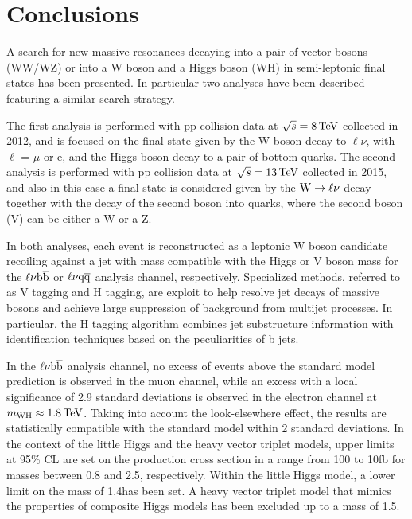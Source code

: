 \chapter{Conclusions}
\label{ch:summary1}

A search for new massive resonances decaying into a pair of vector bosons (WW/WZ) or into a W boson and a Higgs boson (WH)
in semi-leptonic final states has been presented. In particular two analyses have been described featuring a similar search strategy.

The first analysis is performed with pp collision data at $\sqrt{s} = 8\,\text{Te\hspace{-.08em}V}$ collected in 2012, and is focused on the final state given by the W boson decay to $\ell\nu$, with $\ell$ = $\mu$ or e,
and the Higgs boson decay to a pair of bottom quarks.
The second analysis is performed with pp collision data at $\sqrt{s} = 13\,\text{Te\hspace{-.08em}V}$ collected in 2015, and also in this case a final state is considered given by the $\mathrm{W}\to\ell\nu$ decay together with the decay of the second boson into quarks, where the second boson (V) can be either a W or a Z. 

In both analyses, each event is reconstructed as a leptonic W boson candidate recoiling against a jet with mass compatible with the Higgs or V boson mass for the $\ell\nu{\mathrm{b}\overline{\mathrm{b}}}$ or $\ell\nu\mathrm{q}\overline{\mathrm{q}}$ analysis channel, respectively.
Specialized methods, referred to as V tagging and H tagging, are exploit to help resolve jet decays of massive bosons and achieve large suppression of background from multijet processes.
In particular, the H tagging algorithm combines jet substructure information with identification techniques based on the peculiarities of b jets.

In the $\ell\nu{\mathrm{b}\overline{\mathrm{b}}}$ analysis channel, no excess of events above the standard model prediction is observed in the muon channel,
while an excess with a local significance of 2.9 standard deviations is observed in the electron channel at $m_{\rm WH} \approx 1.8\,\text{Te\hspace{-.08em}V}$.
Taking into account the look-elsewhere effect, the results are statistically compatible with the standard model within 2 standard deviations.
In the context of the little Higgs and the heavy vector triplet models, upper limits at 95\% CL are set on the \Wpr production cross section
in a range from 100 to 10\unit{fb} for masses between 0.8 and 2.5\TeV, respectively.
Within the little Higgs model, a lower limit on the \Wpr mass of 1.4\TeV has been set.
A heavy vector triplet model that mimics the properties of composite Higgs models has been excluded up to a \Wpr mass of 1.5\TeV.

